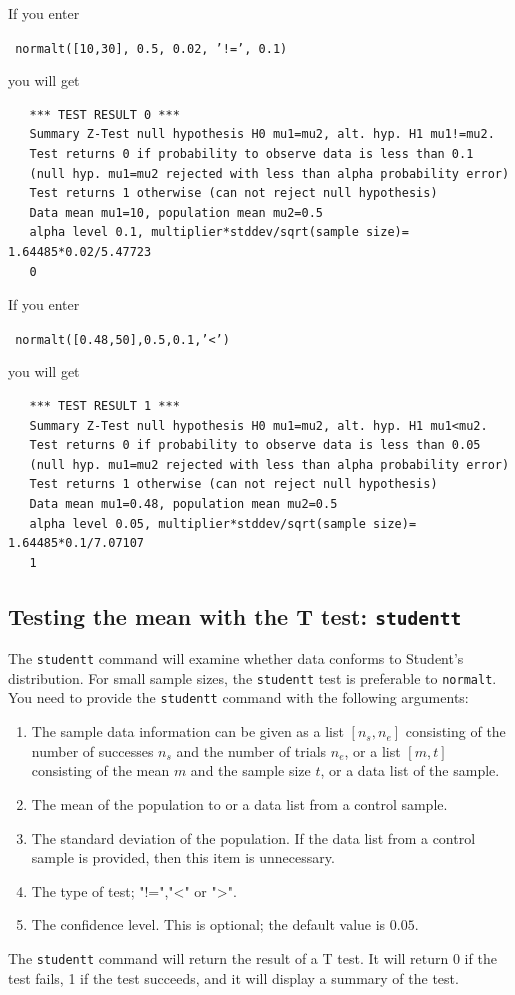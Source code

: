 \documentclass[a4paper,11pt]{book}
\begin{document}
If you enter
\begin{center}
  \tt
  normalt([10,30], 0.5, 0.02, '!=', 0.1)
\end{center}
you will get
\begin{verbatim}
   *** TEST RESULT 0 ***
   Summary Z-Test null hypothesis H0 mu1=mu2, alt. hyp. H1 mu1!=mu2.
   Test returns 0 if probability to observe data is less than 0.1
   (null hyp. mu1=mu2 rejected with less than alpha probability error)
   Test returns 1 otherwise (can not reject null hypothesis)
   Data mean mu1=10, population mean mu2=0.5
   alpha level 0.1, multiplier*stddev/sqrt(sample size)= 1.64485*0.02/5.47723
   0
\end{verbatim}
If you enter
\begin{center}
  \tt
  normalt([0.48,50],0.5,0.1,'<')
\end{center}
you will get
\begin{verbatim}
   *** TEST RESULT 1 ***
   Summary Z-Test null hypothesis H0 mu1=mu2, alt. hyp. H1 mu1<mu2.
   Test returns 0 if probability to observe data is less than 0.05
   (null hyp. mu1=mu2 rejected with less than alpha probability error)
   Test returns 1 otherwise (can not reject null hypothesis)
   Data mean mu1=0.48, population mean mu2=0.5
   alpha level 0.05, multiplier*stddev/sqrt(sample size)= 1.64485*0.1/7.07107
   1
\end{verbatim}

\subsection{Testing the mean with the T test: \texttt{studentt}}

The \texttt{studentt} command will examine whether data conforms to
Student's distribution.  For small sample sizes, the \texttt{studentt}
test is preferable to \texttt{normalt}.
You need to provide the \texttt{studentt} command with the following
arguments:
\begin{enumerate}
  \item
  The sample data information can be given as a list $[n_s,n_e]$
  consisting of the number of successes $n_s$ and the number of trials
  $n_e$, or a list $[m,t]$ consisting of the mean $m$ and the sample
  size $t$, or a data list of the sample.
  \item
  The mean of the population to or a data list from a control sample.
  \item
  The standard deviation of the population.  If the data list from a
  control sample is provided, then this item is unnecessary.
  \item
  The type of test; "!=","<" or ">".
  \item
  The confidence level.  This is optional; the default
  value is $0.05$.
\end{enumerate}
The \texttt{studentt} command will return the result of a T test.  It
will return 0 if the test fails, 1 if the test succeeds, and it will
display a summary of the test.
\end{document}
